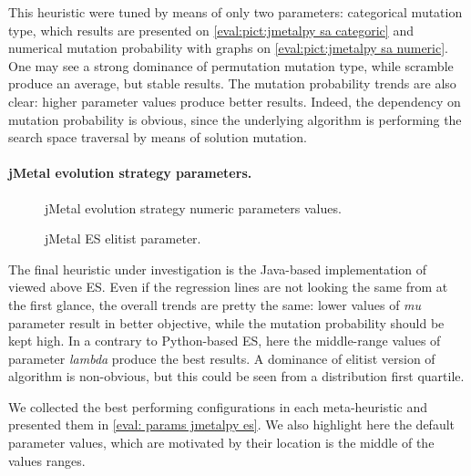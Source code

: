 This heuristic were tuned by means of only two parameters: categorical mutation type, which results are presented on \cref{eval:pict:jmetalpy sa categoric} and numerical mutation probability with graphs on \cref{eval:pict:jmetalpy sa numeric}. One may see a strong dominance of permutation mutation type, while scramble produce an average, but stable results. The mutation probability trends are also clear: higher parameter values produce better results. Indeed, the dependency on mutation probability is obvious, since the underlying algorithm is performing the search space traversal by means of solution mutation.


\paragraph{jMetal evolution strategy parameters.}
\begin{figure}[h]
	\centering
	\vspace{-10pt}
	
	\caption{jMetal evolution strategy numeric parameters values.}
	\vspace{-15pt}
	\label{eval:pict:jmetal es numeric}
\end{figure}

\begin{wrapfigure}{R}{0.4\textwidth}
	\centering
	\vspace{-20pt}
	
	\label{eval:pict:jmetal es categoric}
	\caption{jMetal ES elitist parameter.}
	\vspace{-30pt}
\end{wrapfigure}

The final heuristic under investigation is the Java-based implementation of viewed above ES. Even if the regression lines are not looking the same from at the first glance, the overall trends are pretty the same: lower values of \emph{mu} parameter result in better objective, while the mutation probability should be kept high. In a contrary to Python-based ES, here the middle-range values of parameter \emph{lambda} produce the best results. A dominance of elitist version of algorithm is non-obvious, but this could be seen from a distribution first quartile.

We collected the best performing configurations in each meta-heuristic and presented them in \cref{eval: params jmetalpy es}. We also highlight here the default parameter values, which are motivated by their location is the middle of the values ranges.

